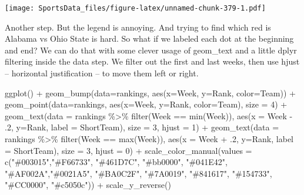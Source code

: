 \documentclass[
]{book}
\newenvironment{Shaded}{\begin{snugshade}}{\end{snugshade}}
\newcommand{\AttributeTok}[1]{\textcolor[rgb]{0.77,0.63,0.00}{#1}}
\newcommand{\DecValTok}[1]{\textcolor[rgb]{0.00,0.00,0.81}{#1}}
\newcommand{\FunctionTok}[1]{\textcolor[rgb]{0.00,0.00,0.00}{#1}}
\newcommand{\NormalTok}[1]{#1}
\newcommand{\SpecialCharTok}[1]{\textcolor[rgb]{0.00,0.00,0.00}{#1}}
\newcommand{\StringTok}[1]{\textcolor[rgb]{0.31,0.60,0.02}{#1}}
\begin{document}
\texttt{[image: SportsData\_files/figure-latex/unnamed-chunk-379-1.pdf]}

Another step. But the legend is annoying. And trying to find which red is Alabama vs Ohio State is hard. So what if we labeled each dot at the beginning and end? We can do that with some clever usage of geom\_text and a little dplyr filtering inside the data step. We filter out the first and last weeks, then use hjust -- horizontal justification -- to move them left or right.

\begin{Shaded}
\begin{Highlighting}[]
\FunctionTok{ggplot}\NormalTok{() }\SpecialCharTok{+} 
  \FunctionTok{geom\_bump}\NormalTok{(}\AttributeTok{data=}\NormalTok{rankings, }\FunctionTok{aes}\NormalTok{(}\AttributeTok{x=}\NormalTok{Week, }\AttributeTok{y=}\NormalTok{Rank, }\AttributeTok{color=}\NormalTok{Team)) }\SpecialCharTok{+} 
  \FunctionTok{geom\_point}\NormalTok{(}\AttributeTok{data=}\NormalTok{rankings, }\FunctionTok{aes}\NormalTok{(}\AttributeTok{x=}\NormalTok{Week, }\AttributeTok{y=}\NormalTok{Rank, }\AttributeTok{color=}\NormalTok{Team), }\AttributeTok{size =} \DecValTok{4}\NormalTok{) }\SpecialCharTok{+}   
  \FunctionTok{geom\_text}\NormalTok{(}\AttributeTok{data =}\NormalTok{ rankings }\SpecialCharTok{\%\textgreater{}\%} \FunctionTok{filter}\NormalTok{(Week }\SpecialCharTok{==} \FunctionTok{min}\NormalTok{(Week)), }\FunctionTok{aes}\NormalTok{(}\AttributeTok{x =}\NormalTok{ Week }\SpecialCharTok{{-}}\NormalTok{ .}\DecValTok{2}\NormalTok{, }\AttributeTok{y=}\NormalTok{Rank, }\AttributeTok{label =}\NormalTok{ ShortTeam), }\AttributeTok{size =} \DecValTok{3}\NormalTok{, }\AttributeTok{hjust =} \DecValTok{1}\NormalTok{) }\SpecialCharTok{+}
  \FunctionTok{geom\_text}\NormalTok{(}\AttributeTok{data =}\NormalTok{ rankings }\SpecialCharTok{\%\textgreater{}\%} \FunctionTok{filter}\NormalTok{(Week }\SpecialCharTok{==} \FunctionTok{max}\NormalTok{(Week)), }\FunctionTok{aes}\NormalTok{(}\AttributeTok{x =}\NormalTok{ Week }\SpecialCharTok{+}\NormalTok{ .}\DecValTok{2}\NormalTok{, }\AttributeTok{y=}\NormalTok{Rank, }\AttributeTok{label =}\NormalTok{ ShortTeam), }\AttributeTok{size =} \DecValTok{3}\NormalTok{, }\AttributeTok{hjust =} \DecValTok{0}\NormalTok{) }\SpecialCharTok{+}
  \FunctionTok{scale\_color\_manual}\NormalTok{(}\AttributeTok{values =} \FunctionTok{c}\NormalTok{(}\StringTok{"\#003015"}\NormalTok{,}\StringTok{"\#F66733"}\NormalTok{, }\StringTok{"\#461D7C"}\NormalTok{, }\StringTok{"\#bb0000"}\NormalTok{, }\StringTok{"\#041E42"}\NormalTok{, }\StringTok{"\#AF002A"}\NormalTok{,}\StringTok{"\#0021A5"}\NormalTok{, }\StringTok{"\#BA0C2F"}\NormalTok{, }\StringTok{"\#7A0019"}\NormalTok{, }\StringTok{"\#841617"}\NormalTok{, }\StringTok{"\#154733"}\NormalTok{, }\StringTok{"\#CC0000"}\NormalTok{, }\StringTok{"\#c5050c"}\NormalTok{)) }\SpecialCharTok{+}
  \FunctionTok{scale\_y\_reverse}\NormalTok{() }
\end{Highlighting}
\end{Shaded}
\end{document}
